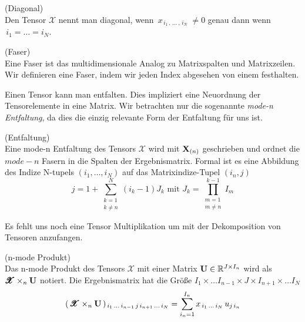 \begin{Definition} (Diagonal) \\
Den Tensor $\pmb{\mathscr{X}}$ nennt man diagonal, wenn
$\, x_{ \, i_1 \,, \, \dots \, , \, i_N \, } \, \neq 0$ genau dann wenn \\ $\, i_1 = \dots = i_N$.
\end{Definition}

\begin{Definition} (Faser) \\
Eine Faser ist das multidimensionale Analog zu Matrixspalten und Matrixzeilen. Wir definieren eine Faser, indem wir jeden Index abgesehen von einem festhalten.
\end{Definition}

Einen Tensor kann man entfalten. Dies impliziert eine Neuordnung der Tensorelemente in eine Matrix.
Wir betrachten nur die sogenannte \textit{mode-n Entfaltung}, da dies die einzig relevante Form der Entfaltung für uns ist.

\begin{Bemerkung} (Entfaltung) \\
Eine mode-n Entfaltung des Tensors $\pmb{\mathscr{X}}$ wird mit $\bold{X}_{(n)}$ geschrieben und ordnet die $mode-n$ Fasern in die Spalten der Ergebnismatrix.
Formal ist es eine Abbildung des Indize N-tupels $(i_1,\dots,i_N)$ auf das Matrixindize-Tupel $(i_n,j) $
\begin{equation}
j=1+\sum_{\substack{k=1 \\ k \neq n}}^{N} (i_k-1)J_k \text{ mit } J_k = \prod_{\substack{m=1 \\ m \neq n}}^{k-1} I_m
\end{equation}
\end{Bemerkung}

Es fehlt uns noch eine Tensor Multiplikation um mit der Dekomposition von Tensoren anzufangen. 

\begin{Definition} (n-mode Produkt) \\
Das n-mode Produkt des Tensors $\pmb{\mathscr{X}}$ mit einer Matrix $\bold{U} \in \mathbb{R}^{J \times I_n}$ wird als $\pmb{\mathscr{X}} \times_n \bold{U}$ notiert. Die Ergebnismatrix hat die Größe $I_1 \times \dots I_{n-1} \times J \times I_{n+1} \times \dots I_N$
\begin{equation}
	(\, \pmb{\mathscr{X}} \times_n \bold{U} \, )_{\, i_1 \, \dots \, i_{n-1} \, j \, i_{n+1}\, \dots \, i_N} = \sum_{i_n = 1}^{I_n} x_{\, i_1 \, \dots \, i_N} \, u_{j \, i_n}
\end{equation}
\end{Definition}

